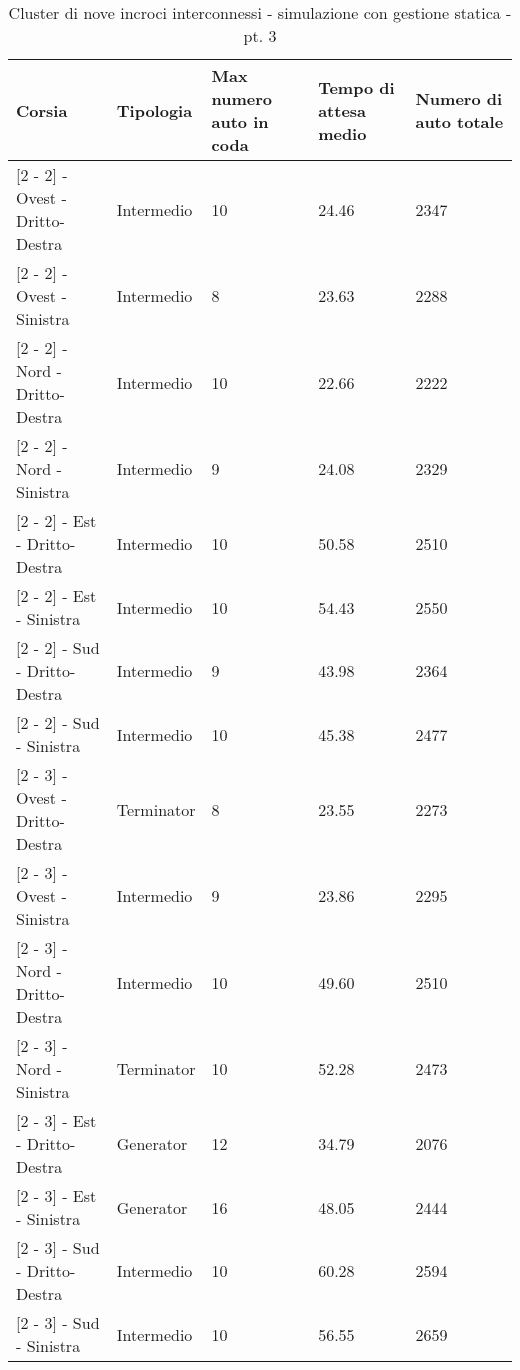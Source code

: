 \begin{table}[H]
\centering
\begin{tabular}{|C{2cm}|C{2cm}|C{3cm}|C{3cm}|C{3cm}|}
\hline
\textbf{Corsia} &
\textbf{Tipologia} &
\textbf{Max numero auto in coda} &
\textbf{Tempo di attesa medio} &
\textbf{Numero di auto totale} \\\hline
\scriptsize{[2 - 2] - Ovest - Dritto-Destra} &
Intermedio &
10 &
24.46 &
2347 \\\hline
\scriptsize{[2 - 2] - Ovest - Sinistra} &
Intermedio &
8 &
23.63 &
2288 \\\hline
\scriptsize{[2 - 2] - Nord - Dritto-Destra} &
Intermedio &
10 &
22.66 &
2222 \\\hline
\scriptsize{[2 - 2] - Nord - Sinistra} &
Intermedio &
9 &
24.08 &
2329 \\\hline
\scriptsize{[2 - 2] - Est - Dritto-Destra} &
Intermedio &
10 &
50.58 &
2510 \\\hline
\scriptsize{[2 - 2] - Est - Sinistra} &
Intermedio &
10 &
54.43 &
2550 \\\hline
\scriptsize{[2 - 2] - Sud - Dritto-Destra} &
Intermedio &
9 &
43.98 &
2364 \\\hline
\scriptsize{[2 - 2] - Sud - Sinistra} &
Intermedio &
10 &
45.38 &
2477 \\\hline
\scriptsize{[2 - 3] - Ovest - Dritto-Destra} &
Terminator &
8 &
23.55 &
2273 \\\hline
\scriptsize{[2 - 3] - Ovest - Sinistra} &
Intermedio &
9 &
23.86 &
2295 \\\hline
\scriptsize{[2 - 3] - Nord - Dritto-Destra} &
Intermedio &
10 &
49.60 &
2510 \\\hline
\scriptsize{[2 - 3] - Nord - Sinistra} &
Terminator &
10 &
52.28 &
2473 \\\hline
\scriptsize{[2 - 3] - Est - Dritto-Destra} &
Generator &
12 &
34.79 &
2076 \\\hline
\scriptsize{[2 - 3] - Est - Sinistra} &
Generator &
16 &
48.05 &
2444 \\\hline
\scriptsize{[2 - 3] - Sud - Dritto-Destra} &
Intermedio &
10 &
60.28 &
2594 \\\hline
\scriptsize{[2 - 3] - Sud - Sinistra} &
Intermedio &
10 &
56.55 &
2659 \\\hline
\end{tabular}
\caption{Cluster di nove incroci interconnessi - simulazione con gestione statica - pt. 3}
\label{table:keytable}
\end{table}
\newpage

